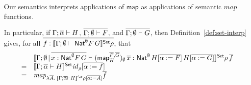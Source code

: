 \documentclass{lmcs}
\theoremstyle{plain}\newtheorem{satz}[thm]{Satz}
\renewcommand{\id}{\mathit{id}}
\newcommand{\map}{\mathsf{map}}
\begin{document}
Our semantics interprets applications of $\map$ as applications of
semantic $\mathit{map}$ functions.
\begin{comment}
Indeed, if \(\Gamma; \ol{\phi},
\ol{\gamma} \vdash H\), \(\ol{\Gamma; \emptyset, \ol{\gamma} \vdash
  F}\), and \(\ol{\Gamma; \Phi, \emptyset, \ol{\gamma} \vdash G}\),
then 
Definition~\ref{def:set-interp} gives
\begin{align}
& \setsem{
\Gamma;\Phi \,|\, \Delta
\vdash \map^{\ol{F},\ol{G}}_H \,\ol t
: %
\Nat^{\ol{\gamma}}\,H[\ol{\phi :=_{\ol{\beta}} F}]\,H[\ol{\phi :=_{\ol{\beta}} G}]
} \rho \nonumber \\ 
=\;\; & \lambda d\, \ol{\eta}\,\ol{B}.\,
\setsem{\Gamma; \ol{\phi},\ol{\gamma}\vdash H}
\id_{\rho[\ol{\gamma := B}]}[\ol{\phi := \lambda
    \ol{A}.\eta_{\ol{A}\,\ol{B}}}] \label{eq:map-sem-def}
\end{align}
\end{comment}
In particular, if $\Gamma; \overline{\alpha} \vdash H$, $\overline{\Gamma;
  \emptyset \vdash F}$, and $\overline{\Gamma; \emptyset \vdash G}$, then
Definition~\ref{def:set-interp} gives, for all $\overline{f :
  \llbracket{\Gamma;\emptyset \vdash \mathsf{Nat}^\emptyset F\,G}\rrbracket^{\mathsf{Set}}\rho}$, that
\[\begin{array}{rl}
&\setsem{ \Gamma;\emptyset\,|\,\ol{x : \Nat^\emptyset F \, G}
  \vdash (\map^{\ol{F},\ol{G}}_H)_\emptyset\,\ol x :
  \Nat^{\emptyset}\,H[\ol{\alpha := F}]\,H[\ol{\alpha := G}]}
\rho\,\ol f\\ =& \setsem{\Gamma; \ol{\alpha}\vdash H}
\id_{\rho}[\ol{\alpha := f}] \\ =&
\mathit{map}_{\lambda \ol{A}.\,\setsem{\Gamma; \ol{\alpha}\vdash H} \rho [\ol{\alpha := A}]} \ol{f} \\
\end{array}
\]
\end{document}
